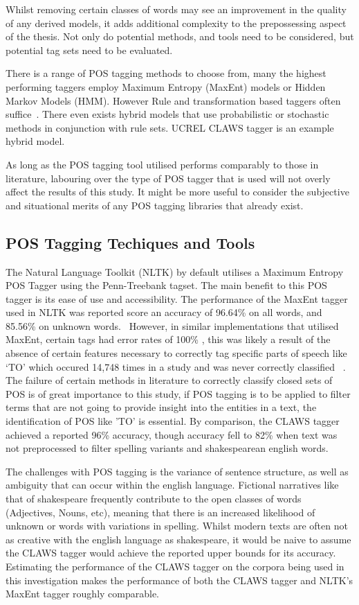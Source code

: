 \documentclass[10pt]{report}
\begin{document}
Whilst removing certain classes of words may see an improvement in the quality of any derived models, it adds additional complexity to the prepossessing aspect of the thesis. Not only do potential methods, and tools need to be considered, but potential tag sets need to be evaluated.

There is a range of POS tagging methods to choose from, many the highest performing taggers employ Maximum Entropy (MaxEnt) models or Hidden Markov Models (HMM). However Rule and transformation based taggers often suffice~\cite{Brill1995-sr,Brill1992-hh,Huang2009-xb,Cutting1992-vx}. There even exists hybrid models that use probabilistic or stochastic methods in conjunction with rule sets. UCREL CLAWS tagger is an example hybrid model.~\cite{Leech1994-rh}

As long as the POS tagging tool utilised performs comparably to those in literature, labouring over the type of POS tagger that is used will not overly affect the results of this study. It might be more useful to consider the subjective and situational merits of any POS tagging libraries that already exist.

\subsection{POS Tagging Techiques and Tools}
The Natural Language Toolkit (NLTK) by default utilises a Maximum Entropy POS Tagger using the Penn-Treebank tagset. The main benefit to this POS tagger is its ease of use and accessibility. The performance of the MaxEnt tagger used in NLTK was reported score an accuracy of 96.64\% on all words, and 85.56\% on unknown words.~\cite{Ratnaparkhi1996-oa} However, in similar implementations that utilised MaxEnt, certain tags had error rates of 100\% , this was likely a result of the absence of certain features necessary to correctly tag specific parts of speech like ‘TO’ which occured 14,748 times in a study and was never correctly classified ~\cite{Malecha2010-fl}.  The failure of certain methods in literature to correctly classify closed sets of POS is of great importance to this study, if POS tagging is to be applied to filter terms that are not going to provide insight into the entities in a text, the identification of POS like 'TO' is essential. By comparison, the CLAWS tagger achieved a reported 96\% accuracy, though accuracy fell to 82\% when text was not preprocessed to filter spelling variants and shakespearean english words.

The challenges with POS tagging is the variance of sentence structure, as well as ambiguity that can occur within the english language. Fictional narratives like that of shakespeare frequently contribute to the open classes of words (Adjectives, Nouns, etc), meaning that there is an increased likelihood of unknown or words with variations in spelling. Whilst modern texts are often not as creative with the english language as shakespeare, it would be naive to assume the CLAWS tagger would achieve the reported upper bounds for its accuracy. Estimating the performance of the CLAWS tagger on the corpora being used in this investigation makes the performance of both the CLAWS tagger and NLTK’s MaxEnt tagger roughly comparable.
\end{document}
